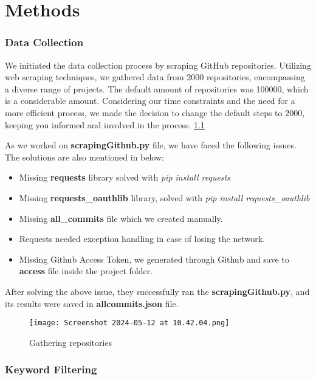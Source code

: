 \chapter{Methods}\label{chap:methods}

\subsection{Data Collection}

We initiated the data collection process by scraping GitHub repositories. 
Utilizing web scraping techniques, we gathered data from 2000 repositories, encompassing a diverse range of projects. 
The default amount of repositories was 100000, which is a considerable amount. 
Considering our time constraints and the need for a more efficient process, we made the decision to change the default steps to 2000, keeping you informed and involved in the process. \ref{fig:srapingLabel}

As we worked on \textbf{scrapingGithub.py} file, we have faced the following issues. The solutions are also mentioned in below:
\begin{itemize}
    \item Missing \textbf{requests} library solved with \textit{ pip install requests }
    \item Missing \textbf{requests\_oauthlib} library, solved with  \textit{pip install requests\_oauthlib}
    \item Missing \textbf{all\_commits} file which we created manually.
    \item Requests needed exception handling in case of losing the network.
    \item Missing Github Access Token, we generated through Github and save to \textbf{access} file inside the project folder. 
\end{itemize}

After solving the above issue, they successfully ran the \textbf{scrapingGithub.py}, and its results were saved in \textbf{allcommits.json} file.

\begin{figure}
    \centering
    \texttt{[image: Screenshot 2024-05-12 at 10.42.04.png]}
    \caption{Gathering repositories}
    \label{fig:srapingLabel}
\end{figure}


\subsection{Keyword Filtering}

